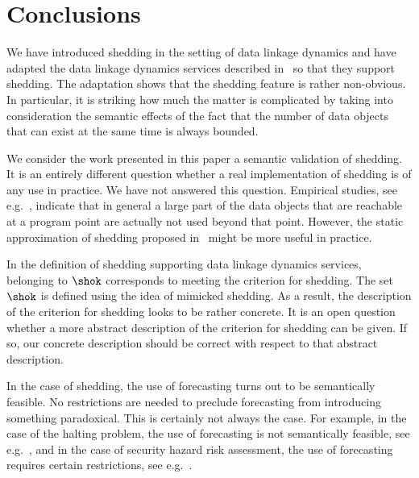 \documentclass[fleqn]{llncs}
\begin{document}
\section{Conclusions}
\label{sect-concl}

We have introduced shedding in the setting of data linkage dynamics and
have adapted the data linkage dynamics services described
in~\cite{BM08d} so that they support shedding.
The adaptation shows that the shedding feature is rather non-obvious.
In particular, it is striking how much the matter is complicated by
taking into consideration the semantic effects of the fact that the
number of data objects that can exist at the same time is always
bounded.

We consider the work presented in this paper a semantic validation of
shedding.
It is an entirely different question whether a real implementation of
shedding is of any use in practice.
We have not answered this question.
Empirical studies, see e.g.~\cite{HDH02a}, indicate that in general a
large part of the data objects that are reachable at a program point are
actually not used beyond that point.
However, the static approximation of shedding proposed in~\cite{KSK07a}
might be more useful in practice.

In the definition of shedding supporting data linkage dynamics services,
belonging to $\shok$ corresponds to meeting the criterion for shedding.
The set $\shok$ is defined using the idea of mimicked shedding.
As a result, the description of the criterion for shedding looks to be
rather concrete.
It is an open question whether a more abstract description of the
criterion for shedding can be given.
If so, our concrete description should be correct with respect to that
abstract description.

In the case of shedding, the use of forecasting turns out to be
semantically feasible.
No restrictions are needed to preclude forecasting from introducing
something paradoxical.
This is certainly not always the case.
For example, in the case of the halting problem, the use of forecasting
is not semantically feasible, see e.g.~\cite{BP04a}, and in the case of
security hazard risk assessment, the use of forecasting requires certain
restrictions, see e.g.~\cite{BBP07a}.



\end{document}
